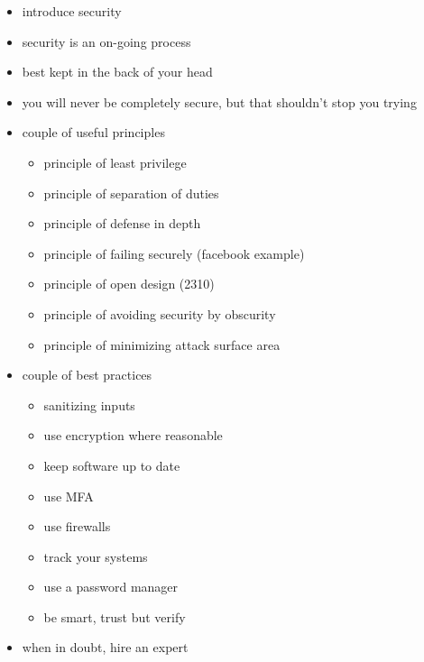 \documentclass{csse4400}
\begin{document}
\begin{drafting}
\begin{itemize}
    \item introduce security
    \item security is an on-going process
    \item best kept in the back of your head
    \item you will never be completely secure, but that shouldn't stop you trying
    \item couple of useful principles
    \begin{itemize}
        \item principle of least privilege
        \item principle of separation of duties
        \item principle of defense in depth
        \item principle of failing securely (facebook example)
        \item principle of open design (2310)
        \item principle of avoiding security by obscurity
        \item principle of minimizing attack surface area
    \end{itemize}
    \item couple of best practices
    \begin{itemize}
        \item sanitizing inputs
        \item use encryption where reasonable
        \item keep software up to date
        \item use MFA
        \item use firewalls
        \item track your systems
        \item use a password manager
        \item be smart, trust but verify
    \end{itemize}
    \item when in doubt, hire an expert
\end{itemize}
\end{drafting}




\end{document}
